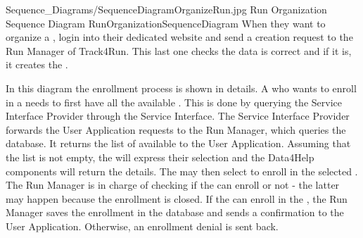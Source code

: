 \documentclass[../../DD.tex]{subfiles}
\begin{document}


	

	\image {13cm} {Sequence_Diagrams/SequenceDiagramOrganizeRun.jpg} {Run Organization Sequence Diagram} {RunOrganizationSequenceDiagram}
	When they want to organize a ,  login into their dedicated website and send a  creation request to the Run Manager of Track4Run. This last one checks the  data is correct and if it is, it creates the .

	In this diagram the  enrollment process is shown in details. A  who wants to enroll in a  needs to first have all the available . This is done by querying the Service Interface Provider through the Service Interface. The Service Interface Provider forwards the User Application requests to the Run Manager, which queries the database. It returns the list of available  to the User Application. Assuming that the list is not empty, the  will express their selection and the Data4Help components will return the  details. The  may then select to enroll in the selected . The Run Manager is in charge of checking if the  can enroll or not - the latter may happen because the enrollment is closed. If the  can enroll in the , the Run Manager saves the enrollment in the database and sends a confirmation to the User Application. Otherwise, an enrollment denial is sent back.
\end{document}
